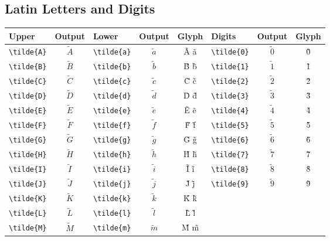 \documentclass[12pt,a4paper]{article}
\begin{document}
\subsection*{Latin Letters and Digits}
\begin{longtable}{|l|c|l|c|c|l|c|c|}
\hline
\textbf{Upper}   & \textbf{Output} & \textbf{Lower}   & \textbf{Output} & \textbf{Glyph} & \textbf{Digits}  & \textbf{Output} & \textbf{Glyph} \\
\hline
\verb|\tilde{A}| & $\tilde{A}$     & \verb|\tilde{a}| & $\tilde{a}$     & Ã ã            & \verb|\tilde{0}| & $\tilde{0}$     & 0̃ \\
\verb|\tilde{B}| & $\tilde{B}$     & \verb|\tilde{b}| & $\tilde{b}$     & B̃ b̃            & \verb|\tilde{1}| & $\tilde{1}$     & 1̃ \\
\verb|\tilde{C}| & $\tilde{C}$     & \verb|\tilde{c}| & $\tilde{c}$     & C̃ c̃            & \verb|\tilde{2}| & $\tilde{2}$     & 2̃ \\
\verb|\tilde{D}| & $\tilde{D}$     & \verb|\tilde{d}| & $\tilde{d}$     & D̃ d̃            & \verb|\tilde{3}| & $\tilde{3}$     & 3̃ \\
\verb|\tilde{E}| & $\tilde{E}$     & \verb|\tilde{e}| & $\tilde{e}$     & Ẽ ẽ            & \verb|\tilde{4}| & $\tilde{4}$     & 4̃ \\
\verb|\tilde{F}| & $\tilde{F}$     & \verb|\tilde{f}| & $\tilde{f}$     & F̃ f̃            & \verb|\tilde{5}| & $\tilde{5}$     & 5̃ \\
\verb|\tilde{G}| & $\tilde{G}$     & \verb|\tilde{g}| & $\tilde{g}$     & G̃ g̃            & \verb|\tilde{6}| & $\tilde{6}$     & 6̃ \\
\verb|\tilde{H}| & $\tilde{H}$     & \verb|\tilde{h}| & $\tilde{h}$     & H̃ h̃            & \verb|\tilde{7}| & $\tilde{7}$     & 7̃ \\
\verb|\tilde{I}| & $\tilde{I}$     & \verb|\tilde{i}| & $\tilde{i}$     & Ĩ ĩ            & \verb|\tilde{8}| & $\tilde{8}$     & 8̃ \\
\verb|\tilde{J}| & $\tilde{J}$     & \verb|\tilde{j}| & $\tilde{j}$     & J̃ j̃            & \verb|\tilde{9}| & $\tilde{9}$     & 9̃ \\
\verb|\tilde{K}| & $\tilde{K}$     & \verb|\tilde{k}| & $\tilde{k}$     & K̃ k̃            &                  &                 & \\
\verb|\tilde{L}| & $\tilde{L}$     & \verb|\tilde{l}| & $\tilde{l}$     & L̃ l̃            &                  &                 & \\
\verb|\tilde{M}| & $\tilde{M}$     & \verb|\tilde{m}| & $\tilde{m}$     & M̃ m̃            &                  &                 & \\

\end{longtable}
\end{document}
